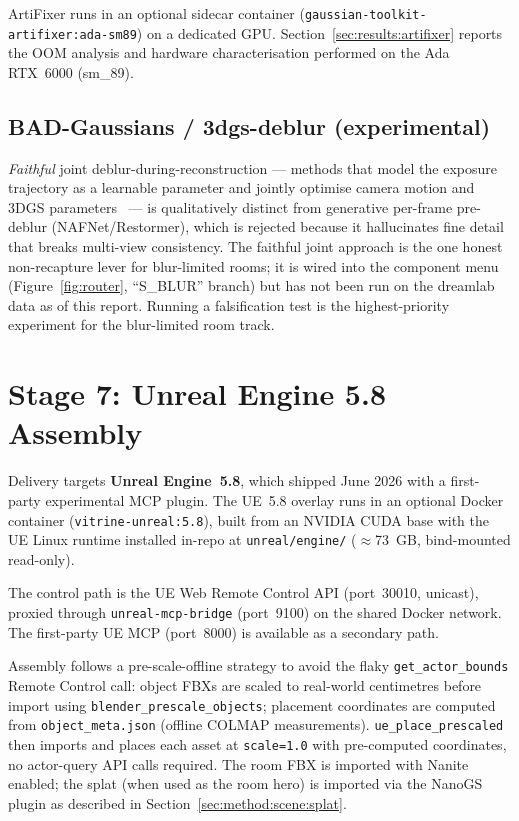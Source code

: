 ArtiFixer runs in an optional sidecar container (\texttt{gaussian-toolkit-artifixer:ada-sm89})
on a dedicated GPU.  Section~\ref{sec:results:artifixer} reports the OOM analysis and
hardware characterisation performed on the Ada RTX~6000 (sm\_89).

\subsection{BAD-Gaussians / 3dgs-deblur (experimental)}
\label{sec:method:deblur}
\emph{Faithful} joint deblur-during-reconstruction --- methods that model the exposure
trajectory as a learnable parameter and jointly optimise camera motion and 3DGS
parameters~\cite{zhao2024_badgaussians} --- is qualitatively distinct from generative
per-frame pre-deblur (NAFNet/Restormer), which is rejected because it hallucinates
fine detail that breaks multi-view consistency.  The faithful joint approach is the one
honest non-recapture lever for blur-limited rooms; it is wired into the component menu
(Figure~\ref{fig:router}, ``S\_BLUR'' branch) but has not been run on the dreamlab data
as of this report.  Running a falsification test is the highest-priority experiment for
the blur-limited room track.

\section{Stage 7: Unreal Engine 5.8 Assembly}
\label{sec:method:ue}

Delivery targets \textbf{Unreal Engine~5.8}, which shipped June 2026 with a first-party
experimental MCP plugin.  The UE~5.8 overlay runs in an optional Docker container
(\texttt{vitrine-unreal:5.8}), built from an NVIDIA CUDA base with the UE Linux runtime
installed in-repo at \texttt{unreal/engine/} ($\approx$73~GB, bind-mounted read-only).

The control path is the UE Web Remote Control API (port~30010, unicast), proxied through
\texttt{unreal-mcp-bridge} (port~9100) on the shared Docker network.  The first-party
UE MCP (port~8000) is available as a secondary path.

Assembly follows a pre-scale-offline strategy to avoid the flaky
\texttt{get\_actor\_bounds} Remote Control call: object FBXs are scaled to real-world
centimetres before import using \texttt{blender\_prescale\_objects}; placement coordinates
are computed from \texttt{object\_meta.json} (offline COLMAP measurements).
\texttt{ue\_place\_prescaled} then imports and places each asset at \texttt{scale=1.0}
with pre-computed coordinates, no actor-query API calls required.  The room FBX is
imported with Nanite enabled; the splat (when used as the room hero) is imported via the
NanoGS plugin as described in Section~\ref{sec:method:scene:splat}.
